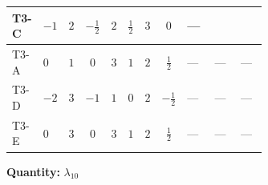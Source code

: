 \documentclass[8pt]{article}
\begin{document}
\begin{landscape}
\begin{longtable}{@{}llcccccc >{\raggedright\arraybackslash}p{0.21\linewidth} >{\raggedright\arraybackslash}p{0.21\linewidth} >{\raggedright\arraybackslash}p{0.21\linewidth}@{}}
\midrule
T3-C & $-1$ & $2$ & $-\frac{1}{2}$ & $2$ & $\frac{1}{2}$ & $3$ & $0$ & --- & \scriptsize\adjustbox{max width=\linewidth}{$\begin{gathered} +{\lambda_{12}^{(A)}} \left(\frac{1}{8} \operatorname{Tr}\!\left({y_2}\,\left({y_1}\right)^{\dagger}\right)+\frac{5 {\lambda_{10}}}{6}+\frac{{\lambda_{11}}}{6}\right)\end{gathered}$} & \scriptsize\adjustbox{max width=\linewidth}{$\begin{gathered} +{\lambda_9} (3 \operatorname{Tr}\!\left({y_1}\,\left({y_2}\right)^{\dagger}\right)+4 (5 \left({\lambda_{10}}\right)^{*}+\left({\lambda_{11}}\right)^{*}))\end{gathered}$} \\
\midrule
T3-A & $0$ & $1$ & $0$ & $3$ & $1$ & $2$ & $\frac{1}{2}$ & --- & --- & --- \\
\midrule
T3-D & $-2$ & $3$ & $-1$ & $1$ & $0$ & $2$ & $-\frac{1}{2}$ & --- & --- & --- \\
\midrule
T3-E & $0$ & $3$ & $0$ & $3$ & $1$ & $2$ & $\frac{1}{2}$ & --- & --- & --- \\
\midrule
\bottomrule
\end{longtable}
\clearpage
\noindent\textbf{Quantity: }$\lambda_{10}$\par\smallskip

\end{landscape}
\end{document}
